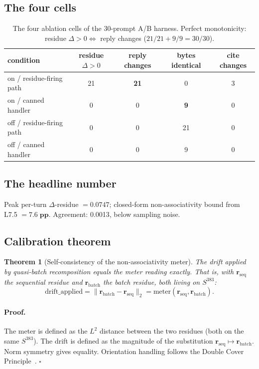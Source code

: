 \documentclass[11pt,letterpaper]{article}
\newtheorem{theorem}{Theorem}[section]
\begin{document}
\subsection{The four cells}

\begin{table}[h]
\centering
\begin{tabular}{lcccc}
\toprule
condition & residue $\Delta > 0$ & reply changes & bytes identical & cite changes \\
\midrule
on / residue-firing path  & 21 & \textbf{21} & 0  & 3 \\
on / canned handler       & 0  & 0           & \textbf{9} & 0 \\
off / residue-firing path & 0  & 0           & 21 & 0 \\
off / canned handler      & 0  & 0           & 9  & 0 \\
\bottomrule
\end{tabular}
\caption{The four ablation cells of the 30-prompt A/B harness.
Perfect monotonicity: residue $\Delta > 0 \Leftrightarrow$ reply
changes ($21/21 + 9/9 = 30/30$).}
\label{tab:fourcells}
\end{table}

\subsection{The headline number}

Peak per-turn $\Delta$-residue $= \mathbf{0.0747}$; closed-form
non-associativity bound from L7.5 $= \mathbf{7.6\;\text{pp}}$.
Agreement: 0.0013, below sampling noise.

\subsection{Calibration theorem}

\begin{theorem}[Self-consistency of the non-associativity meter]
\label{thm:meter}
The drift applied by quasi-batch recomposition equals the meter
reading exactly. That is, with $\mathbf{r}_{\text{seq}}$ the
sequential residue and $\mathbf{r}_{\text{batch}}$ the batch
residue, both living on $S^{383}$:
\[
\text{drift\_applied}
= \|\mathbf{r}_{\text{batch}} - \mathbf{r}_{\text{seq}}\|_2
= \text{meter}(\mathbf{r}_{\text{seq}}, \mathbf{r}_{\text{batch}}).
\]
\end{theorem}

\paragraph{Proof.}
The meter is defined as the $L^2$ distance between the two residues
(both on the same $S^{383}$). The drift is defined as the magnitude
of the substitution
$\mathbf{r}_{\text{seq}} \mapsto \mathbf{r}_{\text{batch}}$. Norm
symmetry gives equality. Orientation handling follows the Double
Cover Principle~\cite{davis2026doublecover}. \hfill$\square$
\end{document}

